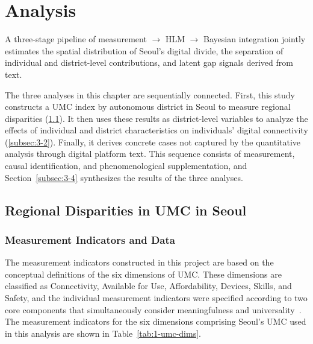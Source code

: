\section{Analysis}
\label{sec:analysis}


\begin{quoteblock}
A three-stage pipeline of measurement $\rightarrow$ HLM $\rightarrow$ Bayesian integration jointly estimates the spatial distribution of Seoul's digital divide, the separation of individual and district-level contributions, and latent gap signals derived from text.
\end{quoteblock}

The three analyses in this chapter are sequentially connected. First, this study constructs a UMC index by autonomous district in Seoul to measure regional disparities (\ref{subsec:3-1}). It then uses these results as district-level variables to analyze the effects of individual and district characteristics on individuals' digital connectivity (\ref{subsec:3-2}). Finally, it derives concrete cases not captured by the quantitative analysis through digital platform text. This sequence consists of measurement, causal identification, and phenomenological supplementation, and Section~\ref{subsec:3-4} synthesizes the results of the three analyses.

\subsection{Regional Disparities in UMC in Seoul}
\label{subsec:3-1}

\subsubsection{Measurement Indicators and Data}
\label{subsubsec:3-1-1}

The measurement indicators constructed in this project are based on the conceptual definitions of the six dimensions of UMC. These dimensions are classified as Connectivity, Available for Use, Affordability, Devices, Skills, and Safety, and the individual measurement indicators were specified according to two core components that simultaneously consider meaningfulness and universality~\citep{ITU2023}. The measurement indicators for the six dimensions comprising Seoul's UMC used in this analysis are shown in Table~\ref{tab:1-umc-dims}.

